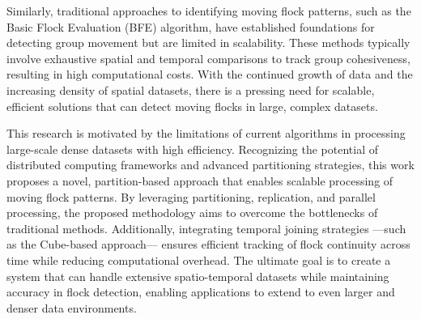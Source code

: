 Similarly, traditional approaches to identifying moving flock patterns, such as the Basic Flock Evaluation (BFE) algorithm, have established foundations for detecting group movement but are limited in scalability. These methods typically involve exhaustive spatial and temporal comparisons to track group cohesiveness, resulting in high computational costs. With the continued growth of data and the increasing density of spatial datasets, there is a pressing need for scalable, efficient solutions that can detect moving flocks in large, complex datasets.

This research is motivated by the limitations of current algorithms in processing large-scale dense datasets with high efficiency. Recognizing the potential of distributed computing frameworks and advanced partitioning strategies, this work proposes a novel, partition-based approach that enables scalable processing of moving flock patterns. By leveraging partitioning, replication, and parallel processing, the proposed methodology aims to overcome the bottlenecks of traditional methods. Additionally, integrating temporal joining strategies —such as the Cube-based approach— ensures efficient tracking of flock continuity across time while reducing computational overhead. The ultimate goal is to create a system that can handle extensive spatio-temporal datasets while maintaining accuracy in flock detection, enabling applications to extend to even larger and denser data environments.
